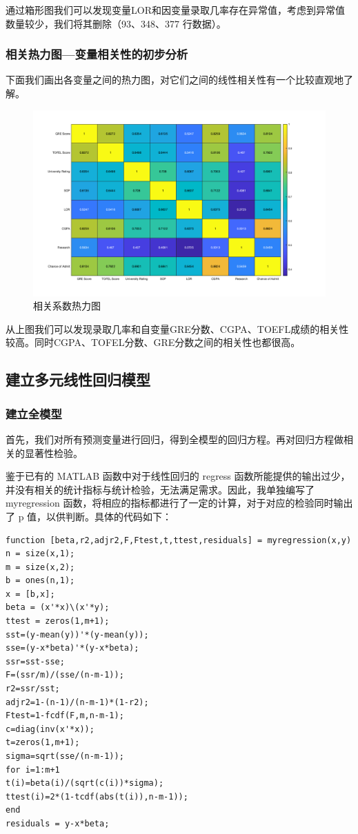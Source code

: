 \documentclass[11pt]{article}
\begin{document}
通过箱形图我们可以发现变量LOR和因变量录取几率存在异常值，考虑到异常值数量较少，我们将其删除（93、348、377  行数据）。
\subsubsection*{相关热力图---变量相关性的初步分析}
下面我们画出各变量之间的热力图，对它们之间的线性相关性有一个比较直观地了解。
\begin{figure}[H]
	\centering
	\caption{相关系数热力图}
	\includegraphics[scale=0.35]{images/heatmap.png}
\end{figure}
从上图我们可以发现录取几率和自变量GRE分数、CGPA、TOEFL成绩的相关性较高。同时CGPA、TOFEL分数、GRE分数之间的相关性也都很高。
\subsection{建立多元线性回归模型}
\subsubsection*{建立全模型}
首先，我们对所有预测变量进行回归，得到全模型的回归方程。再对回归方程做相关的显著性检验。

鉴于已有的 MATLAB 函数中对于线性回归的 regress 函数所能提供的输出过少，并没有相关的统计指标与统计检验，无法满足需求。因此，我单独编写了 myregression 函数，将相应的指标都进行了一定的计算，对于对应的检验同时输出了 p 值，以供判断。具体的代码如下：
\begin{lstlisting}
function [beta,r2,adjr2,F,Ftest,t,ttest,residuals] = myregression(x,y)
n = size(x,1);
m = size(x,2);
b = ones(n,1);
x = [b,x];
beta = (x'*x)\(x'*y);
ttest = zeros(1,m+1);
sst=(y-mean(y))'*(y-mean(y));
sse=(y-x*beta)'*(y-x*beta);
ssr=sst-sse;
F=(ssr/m)/(sse/(n-m-1));
r2=ssr/sst;
adjr2=1-(n-1)/(n-m-1)*(1-r2);
Ftest=1-fcdf(F,m,n-m-1);
c=diag(inv(x'*x));
t=zeros(1,m+1);
sigma=sqrt(sse/(n-m-1));
for i=1:m+1
t(i)=beta(i)/(sqrt(c(i))*sigma);
ttest(i)=2*(1-tcdf(abs(t(i)),n-m-1));
end
residuals = y-x*beta;
\end{lstlisting}
\end{document}
